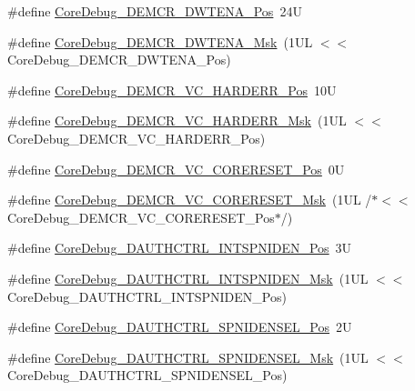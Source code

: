 \begin{DoxyCompactItemize}
\item 
\#define \mbox{\hyperlink{group___c_m_s_i_s___core_debug_ga0cde79c4e741e1eed0513c1f985baeb9}{Core\+Debug\+\_\+\+D\+E\+M\+C\+R\+\_\+\+D\+W\+T\+E\+N\+A\+\_\+\+Pos}}~24U
\item 
\#define \mbox{\hyperlink{group___c_m_s_i_s___core_debug_ga2fcc0b8f174e85379d38e1cb74b8c627}{Core\+Debug\+\_\+\+D\+E\+M\+C\+R\+\_\+\+D\+W\+T\+E\+N\+A\+\_\+\+Msk}}~(1\+U\+L $<$$<$ Core\+Debug\+\_\+\+D\+E\+M\+C\+R\+\_\+\+D\+W\+T\+E\+N\+A\+\_\+\+Pos)
\item 
\#define \mbox{\hyperlink{group___c_m_s_i_s___core_debug_gaed9f42053031a9a30cd8054623304c0a}{Core\+Debug\+\_\+\+D\+E\+M\+C\+R\+\_\+\+V\+C\+\_\+\+H\+A\+R\+D\+E\+R\+R\+\_\+\+Pos}}~10U
\item 
\#define \mbox{\hyperlink{group___c_m_s_i_s___core_debug_ga803fc98c5bb85f10f0347b23794847d1}{Core\+Debug\+\_\+\+D\+E\+M\+C\+R\+\_\+\+V\+C\+\_\+\+H\+A\+R\+D\+E\+R\+R\+\_\+\+Msk}}~(1\+U\+L $<$$<$ Core\+Debug\+\_\+\+D\+E\+M\+C\+R\+\_\+\+V\+C\+\_\+\+H\+A\+R\+D\+E\+R\+R\+\_\+\+Pos)
\item 
\#define \mbox{\hyperlink{group___c_m_s_i_s___core_debug_ga9fcf09666f7063a7303117aa32a85d5a}{Core\+Debug\+\_\+\+D\+E\+M\+C\+R\+\_\+\+V\+C\+\_\+\+C\+O\+R\+E\+R\+E\+S\+E\+T\+\_\+\+Pos}}~0U
\item 
\#define \mbox{\hyperlink{group___c_m_s_i_s___core_debug_ga906476e53c1e1487c30f3a1181df9e30}{Core\+Debug\+\_\+\+D\+E\+M\+C\+R\+\_\+\+V\+C\+\_\+\+C\+O\+R\+E\+R\+E\+S\+E\+T\+\_\+\+Msk}}~(1\+U\+L /$\ast$$<$$<$ Core\+Debug\+\_\+\+D\+E\+M\+C\+R\+\_\+\+V\+C\+\_\+\+C\+O\+R\+E\+R\+E\+S\+E\+T\+\_\+\+Pos$\ast$/)
\item 
\#define \mbox{\hyperlink{group___c_m_s_i_s___core_debug_gaf733a36e6b4717a604f7d77c05dfceb4}{Core\+Debug\+\_\+\+D\+A\+U\+T\+H\+C\+T\+R\+L\+\_\+\+I\+N\+T\+S\+P\+N\+I\+D\+E\+N\+\_\+\+Pos}}~3U
\item 
\#define \mbox{\hyperlink{group___c_m_s_i_s___core_debug_gadad0bf68d32cba49c1ea7534122c2752}{Core\+Debug\+\_\+\+D\+A\+U\+T\+H\+C\+T\+R\+L\+\_\+\+I\+N\+T\+S\+P\+N\+I\+D\+E\+N\+\_\+\+Msk}}~(1\+U\+L $<$$<$ Core\+Debug\+\_\+\+D\+A\+U\+T\+H\+C\+T\+R\+L\+\_\+\+I\+N\+T\+S\+P\+N\+I\+D\+E\+N\+\_\+\+Pos)
\item 
\#define \mbox{\hyperlink{group___c_m_s_i_s___core_debug_ga866734a8e4bec2d6cf091e265c6c0f3d}{Core\+Debug\+\_\+\+D\+A\+U\+T\+H\+C\+T\+R\+L\+\_\+\+S\+P\+N\+I\+D\+E\+N\+S\+E\+L\+\_\+\+Pos}}~2U
\item 
\#define \mbox{\hyperlink{group___c_m_s_i_s___core_debug_gaabb5d6c750c9ec50254134ece2111dcd}{Core\+Debug\+\_\+\+D\+A\+U\+T\+H\+C\+T\+R\+L\+\_\+\+S\+P\+N\+I\+D\+E\+N\+S\+E\+L\+\_\+\+Msk}}~(1\+U\+L $<$$<$ Core\+Debug\+\_\+\+D\+A\+U\+T\+H\+C\+T\+R\+L\+\_\+\+S\+P\+N\+I\+D\+E\+N\+S\+E\+L\+\_\+\+Pos)

\end{DoxyCompactItemize}
